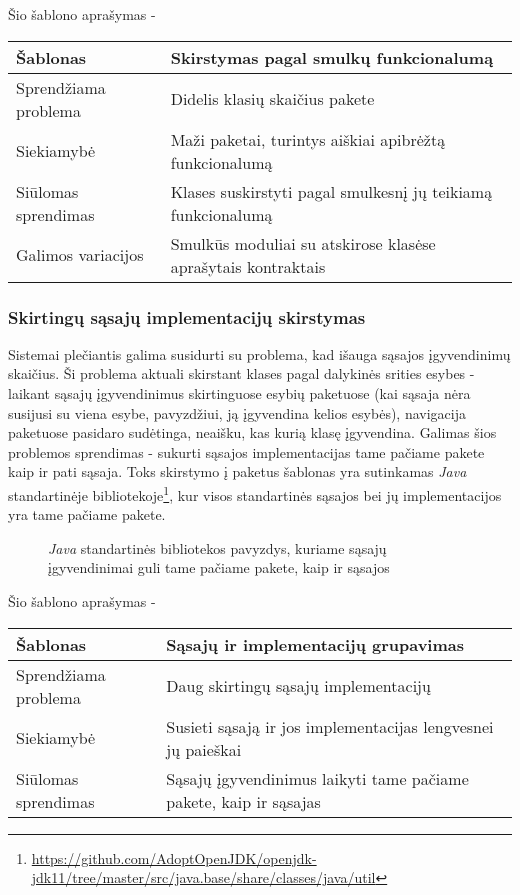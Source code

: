 Šio šablono aprašymas -
\begin{center}
    \begin{tabular}{|p{5cm}|p{10cm}|}
        \hline
        Šablonas &  Skirstymas pagal smulkų funkcionalumą \\ [0.5ex]
        \hline\hline
        Sprendžiama problema & Didelis klasių skaičius pakete\\
        \hline
        Siekiamybė &  Maži paketai, turintys aiškiai apibrėžtą funkcionalumą\\
        \hline
        Siūlomas sprendimas & Klases suskirstyti pagal smulkesnį jų teikiamą funkcionalumą \\
        \hline
        Galimos variacijos & Smulkūs moduliai su atskirose klasėse aprašytais kontraktais \\
        \hline
    \end{tabular}
\end{center}

\subsubsection{Skirtingų sąsajų implementacijų skirstymas}
Sistemai plečiantis galima susidurti su problema, kad išauga sąsajos įgyvendinimų skaičius.
Ši problema aktuali skirstant klases pagal dalykinės srities esybes - laikant sąsajų įgyvendinimus
skirtinguose esybių paketuose (kai sąsaja nėra susijusi su viena esybe, pavyzdžiui, ją įgyvendina kelios esybės),
navigacija paketuose pasidaro sudėtinga, neaišku, kas kurią klasę įgyvendina.
Galimas šios problemos sprendimas - sukurti sąsajos implementacijas tame pačiame pakete kaip ir pati sąsaja.
Toks skirstymo į paketus šablonas yra sutinkamas \textit{Java} standartinėje bibliotekoje\footnote{\url{https://github.com/AdoptOpenJDK/openjdk-jdk11/tree/master/src/java.base/share/classes/java/util}},
kur visos standartinės sąsajos bei jų implementacijos yra tame pačiame pakete.
\begin{figure}[H]
    \snugshade
    \endsnugshade
    \caption{\textit{Java} standartinės bibliotekos pavyzdys, kuriame sąsajų įgyvendinimai guli tame pačiame pakete, kaip ir sąsajos}
\end{figure}

Šio šablono aprašymas -
\begin{center}
\begin{tabular}{|p{5cm}|p{10cm}|}
    \hline
    Šablonas & Sąsajų ir implementacijų grupavimas \\ [0.5ex]
    \hline\hline
    Sprendžiama problema & Daug skirtingų sąsajų implementacijų\\
    \hline
    Siekiamybė &  Susieti sąsają ir jos implementacijas lengvesnei jų paieškai\\
    \hline
    Siūlomas sprendimas & Sąsajų įgyvendinimus laikyti tame pačiame pakete, kaip ir sąsajas \\
    \hline
\end{tabular}
\end{center}

